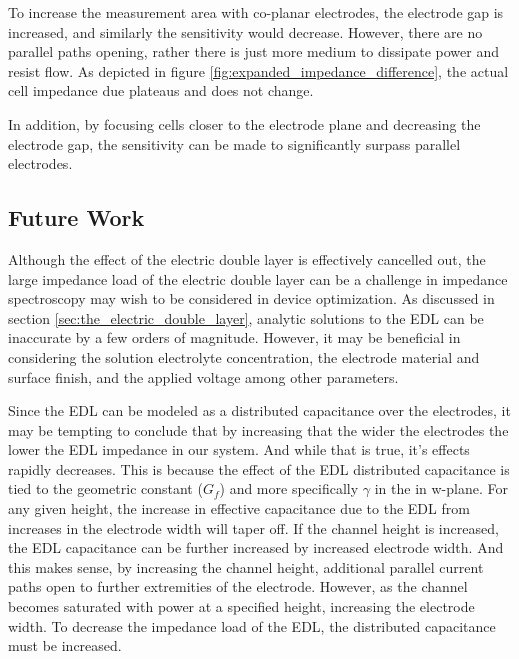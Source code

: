 \par To increase the measurement area with co-planar electrodes, the electrode gap is increased, and similarly the sensitivity would decrease. However, there are no parallel paths opening, rather there is just more medium to dissipate power and resist flow. As depicted in figure \ref{fig:expanded_impedance_difference}, the actual cell impedance due plateaus and does not change.

\par In addition, by focusing cells closer to the electrode plane and decreasing the electrode gap, the sensitivity can be made to significantly surpass parallel electrodes.

\subsection*{Future Work}

\par Although the effect of the electric double layer is effectively cancelled out, the large impedance load of the electric double layer can be a challenge in impedance spectroscopy may wish to be considered in device optimization. As discussed in section \ref{sec:the_electric_double_layer}, analytic solutions to the EDL can be inaccurate by a few orders of magnitude. However, it may be beneficial in considering the solution electrolyte concentration, the electrode material and surface finish, and the applied voltage among other parameters. 

\par Since the EDL can be modeled as a distributed capacitance over the electrodes, it may be tempting to conclude that by increasing that the wider the electrodes the lower the EDL impedance in our system. And while that is true, it's effects rapidly decreases. This is because the effect of the EDL distributed capacitance is tied to the geometric constant ($G_f$) and more specifically $\gamma$ in the in w-plane. For any given height, the increase in effective capacitance due to the EDL from increases in the electrode width will taper off. If the channel height is increased, the EDL capacitance can be further increased by increased electrode width. And this makes sense, by increasing the channel height, additional parallel current paths open to further extremities of the electrode. However, as the channel becomes saturated with power at a specified height, increasing the electrode width. To decrease the impedance load of the EDL, the distributed capacitance must be increased. 

